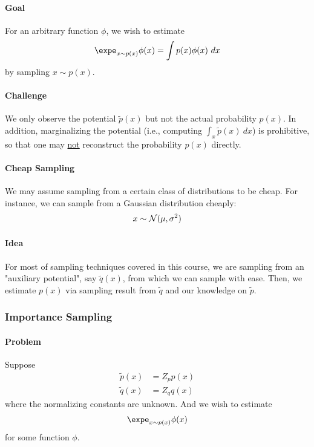 \documentclass{article}
\begin{document}
	\paragraph{Goal} For an arbitrary function $\phi$, we wish to estimate
	\begin{align}
		\expe_{x \sim p(x)} \phi(x) = \int p(x) \phi(x)\ dx
	\end{align}
	by sampling $x \sim p(x)$.

	\paragraph{Challenge} We only observe the potential $\tilde{p}(x)$ but not the actual probability $p(x)$. In addition, marginalizing the potential (i.e., computing $\int_x \tilde{p}(x)\ dx$) is prohibitive, so that one may \ul{not} reconstruct the probability $p(x)$ directly.

	\paragraph{Cheap Sampling} We may assume sampling from a certain class of distributions to be cheap. For instance, we can sample from a Gaussian distribution cheaply:
	\begin{align}
		x \sim \mathcal{{N}}(\mu, \sigma^2)
	\end{align}
	
	\paragraph{Idea} For most of sampling techniques covered in this course, we are sampling from an "auxiliary potential", say $\tilde{q}(x)$, from which we can sample with ease. Then, we estimate $p(x)$ via sampling result from $\tilde{q}$ and our knowledge on $\tilde{p}$.
	
	\subsubsection{Importance Sampling}
	\paragraph{Problem} Suppose
	\begin{align}
		\tilde{p}(x) &= Z_p p(x) \\
		\tilde{q}(x) &= Z_q q(x)
	\end{align}
	where the normalizing constants are unknown. And we wish to estimate 
	\begin{align}
		\expe_{x \sim p(x)} \phi(x)
	\end{align}
	for some function $\phi$.
\end{document}
